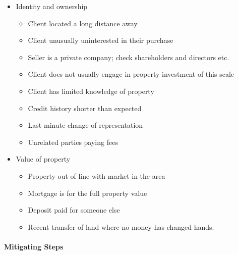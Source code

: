 \documentclass[
]{article}
\providecommand{\tightlist}{%
  \setlength{\itemsep}{0pt}\setlength{\parskip}{0pt}}
\begin{document}
\begin{itemize}
\tightlist
\item
  Identity and ownership

  \begin{itemize}
  \tightlist
  \item
    Client located a long distance away
  \item
    Client unusually uninterested in their purchase
  \item
    Seller is a private company; check shareholders and directors etc.
  \item
    Client does not usually engage in property investment of this scale
  \item
    Client has limited knowledge of property
  \item
    Credit history shorter than expected
  \item
    Last minute change of representation
  \item
    Unrelated parties paying fees
  \end{itemize}
\item
  Value of property

  \begin{itemize}
  \tightlist
  \item
    Property out of line with market in the area
  \item
    Mortgage is for the full property value
  \item
    Deposit paid for someone else
  \item
    Recent transfer of land where no money has changed hands.
  \end{itemize}
\end{itemize}

\hypertarget{mitigating-steps}{%
\paragraph{Mitigating Steps}\label{mitigating-steps}}
\end{document}
